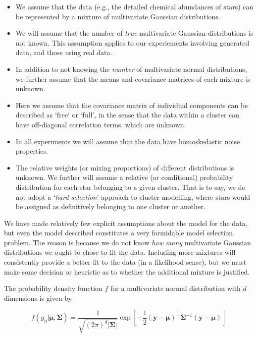 \documentclass{aastex61}
\begin{document}
\begin{itemize}
\item We assume that the data (e.g., the detailed chemical abundances of stars)
      can be represented by a mixture of multivariate Gaussian distributions.
\item We will assume that the number of \emph{true} multivariate Gaussian
      distributions is not known. This assumption applies to our experiements
      involving generated data, and those using real data.
\item In addition to not knowing the \emph{number} of multivariate normal
      distributions, we further assume that the means and covariance matrices of
      each mixture is unknown.
\item Here we assume that the covariance matrix of individual components can be
      described as `free` or `full', in the sense that the data within a cluster
      can have off-diagonal correlation terms, which are unknown.
\item In all experiments we will assume that the data have homoskedastic noise
      properties.
\item The relative weights (or mixing proportions) of different distributions
      is unknown. We further will assume a relative (or conditional)
      probability distribution for each star belonging to a given cluster. That
      is to say, we do not adopt a `\emph{hard selection}' approach to cluster
      modelling, where stars would be assigned as definitively belonging to one
      cluster or another.
\end{itemize}

We have made relatively few explicit assumptions about the model for the data,
but even the model described constitutes a very formidable model selection 
problem. The reason is because we do not know \emph{how many} multivariate
Gaussian distributions we ought to chose to fit the data. Including more
mixtures will consistently provide a better fit to the data (in a likelihood
sense), but we must make some decision or heuristic as to whether the additional
mixture is justified.

The probability density function $f$ for a multivariate normal distribution with
$d$ dimensions is given by

\begin{equation}
    f(y_n|\bm{\mu},\bm{\Sigma}) 
        = \frac{1}{\sqrt{(2\pi)^d|\bm{\Sigma}|}}
          \exp{\left[-\frac{1}{2}(\bm{y} - \bm{\mu})^\intercal\bm{\Sigma}^{-1}(\bm{y} - \bm{\mu})\right]}
\end{equation}
\end{document}
